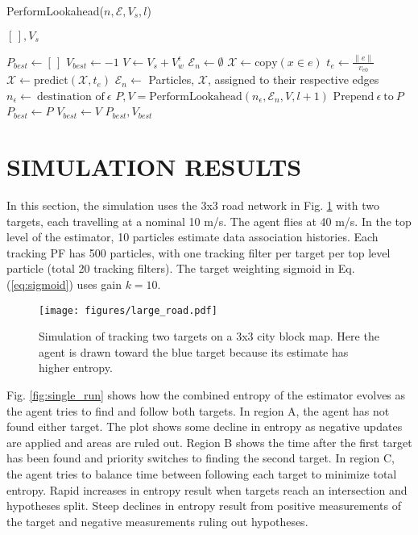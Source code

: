 \documentclass[letterpaper, 10 pt, conference]{ieeeconf}  %
\begin{document}
\begin{algorithm}
\caption{PerformLookahead($n, \mathcal{E}, V_s, l$)}
\begin{algorithmic}[1]
\RETURN $[\,], V_s$
\ENDIF

\STATE $P_{best} \gets[\,]$
\STATE $V_{best} \gets -1$
\STATE $V \gets V_s + V_w^\epsilon$ 
\STATE $\mathcal{E}_n \gets \emptyset$
\STATE $\mathcal{X} \gets \text{copy}(x \in e)$
\STATE $t_e \gets \frac{\lVert e \rVert}{v_{e0}}$
\STATE $\mathcal{X} \gets \text{predict}(\mathcal{X}, t_e)$
\STATE $\mathcal{E}_n \gets$ Particles, $\mathcal{X}$, assigned to their respective edges
\ENDIF
\ENDFOR
\STATE $n_\epsilon \gets \ \text{destination of} \ \epsilon$
\STATE $P, V = \text{PerformLookahead}(n_\epsilon, \mathcal{E}_n, V, l+1)$
\STATE $\text{Prepend} \ \epsilon \ \text{to} \ P$
\STATE $P_{best} \gets P$
\STATE $V_{best} \gets V$
\ENDIF
\ENDFOR
\RETURN $P_{best}, V_{best}$
\end{algorithmic}
\label{lookaheadStep}
\end{algorithm}

\section{SIMULATION RESULTS}\label{results}

In this section, the simulation uses the 3x3 road network in Fig. \ref{fig:larger_roads} with two targets, each travelling at a nominal 10 m/s. The agent flies at 40 m/s. In the top level of the estimator, 10 particles estimate data association histories. Each tracking PF has 500 particles, with one tracking filter per target per top level particle (total 20 tracking filters). The target weighting sigmoid in Eq. (\ref{eq:sigmoid}) uses gain $k=10$.

\begin{figure}
\centering
\texttt{[image: figures/large\_road.pdf]}
\caption{Simulation of tracking two targets on a 3x3 city block map. Here the agent is drawn toward the blue target because its estimate has higher entropy.}
\label{fig:larger_roads}
\end{figure}

Fig. \ref{fig:single_run} shows how the combined entropy of the estimator evolves as the agent tries to find and follow both targets. In region A, the agent has not found either target. The plot shows some decline in entropy as negative updates are applied and areas are ruled out. Region B shows the time after the first target has been found and priority switches to finding the second target. In region C, the agent tries to balance time between following each target to minimize total entropy. Rapid increases in entropy result when targets reach an intersection and hypotheses split. Steep declines in entropy result from positive measurements of the target and negative measurements ruling out hypotheses.
\end{document}
